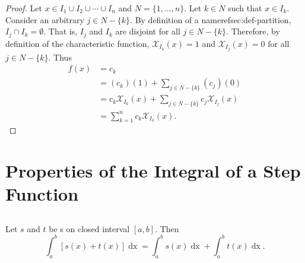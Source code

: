 \documentclass{report}
\begin{document}
\begin{proof}

  Let $x \in I_1 \cup I_2 \cup \cdots \cup I_n$ and $N = \{1, \ldots, n\}$.
  Let $k \in N$ such that $x \in I_k$.
  Consider an arbitrary $j \in N - \{k\}$.
  By definition of a nameref{sec:def-partition}, $I_j \cap I_k = \emptyset$.
  That is, $I_j$ and $I_k$ are disjoint for all $j \in N - \{k\}$.
  Therefore, by definition of the characteristic function,
    $\mathcal{X}_{I_k}(x) = 1$ and $\mathcal{X}_{I_j}(x) = 0$ for all
    $j \in N - \{k\}$.
  Thus
    \begin{align*}
      f(x)
        & = c_k \\
        & = (c_k)(1) + \sum\nolimits_{j \in N - \{k\}} (c_j)(0) \\
        & = c_k\mathcal{X}_{I_k}(x) +
          \sum\nolimits_{j \in N - \{k\}} c_j\mathcal{X}_{I_j}(x) \\
        & = \sum_{k=1}^n c_k\mathcal{X}_{I_k}(x).
    \end{align*}

\end{proof}

\chapter{Properties of the Integral of a Step Function}%
\label{chap:properties-integral-step-function}

\section{}%
\label{sec:step-additive-property}
\label{sec:theorem-1.2}

\begin{theorem}{1.2}

  Let $s$ and $t$ be s on closed interval
    $[a, b]$.
  Then
    $$\int_a^b \left[ s(x) + t(x) \right] \mathop{dx} =
      \int_a^b s(x) \mathop{dx} + \int_a^b t(x) \mathop{dx}.$$

\end{theorem}
\end{document}
